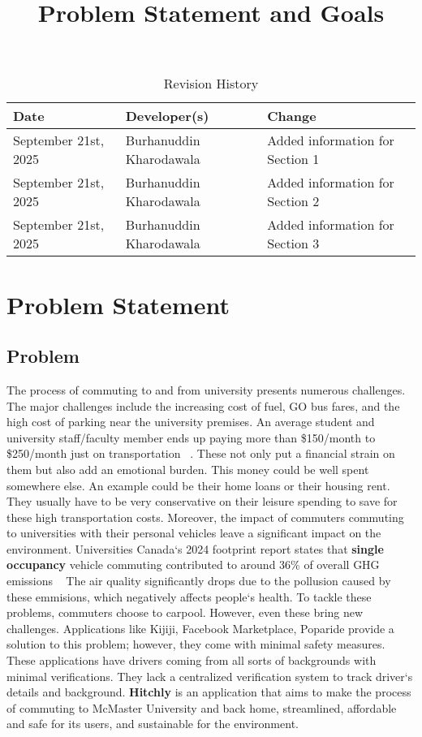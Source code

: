 \documentclass{article}
\title{Problem Statement and Goals\\\progname}
\author{\authname}
\date{}
\begin{document}
\maketitle

\begin{table}[hp]
\caption{Revision History} \label{TblRevisionHistory}
\begin{tabularx}{\textwidth}{llX}
\toprule
\textbf{Date} & \textbf{Developer(s)} & \textbf{Change}\\
\midrule
September 21st, 2025 & Burhanuddin Kharodawala & Added information for Section 1\\
September 21st, 2025 & Burhanuddin Kharodawala & Added information for Section 2\\
September 21st, 2025 & Burhanuddin Kharodawala & Added information for Section 3\\
\bottomrule
\end{tabularx}
\end{table}

\section{Problem Statement}

\subsection{Problem}

The process of commuting to and from university presents numerous 
challenges. The major challenges include the 
increasing cost of fuel, GO bus fares, and the high 
cost of parking near the university premises. 
An average student and university staff/faculty 
member ends up paying more than 
\$150/month to \$250/month just on transportation ~\citep{ChandaAndSo2025}.
These not only put a financial strain on them but also 
add an emotional burden. This money could be well spent somewhere else. 
An example could be their home loans or their housing rent. 
They usually have to be very conservative on their leisure spending to save for these high transportation costs.
Moreover, the impact 
of commuters commuting to universities with their 
personal vehicles leave a significant impact on 
the environment. Universities Canada`s 2024 
footprint report states that \textbf{single occupancy} vehicle commuting contributed to around 
36\% of overall GHG emissions ~\citep{Kebirungi2024}
The air quality significantly drops due to the pollusion caused by these emmisions, which negatively affects people`s health.
To tackle these problems, commuters choose 
to carpool. However, even these bring new 
challenges. Applications like Kijiji, 
Facebook Marketplace, Poparide provide a 
solution to this problem; however, they come 
with minimal safety measures. These applications 
have drivers coming from all sorts of backgrounds 
with minimal verifications. They lack a centralized 
verification system to track driver`s details and background. 
\textbf{Hitchly} is an application that aims to make the process of commuting to McMaster 
University and back home, streamlined, affordable and safe for its users, and 
sustainable for the environment. 
\end{document}
